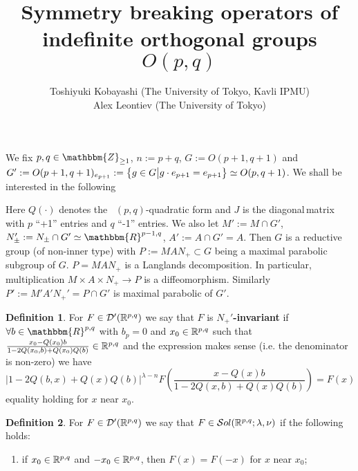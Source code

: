 \documentclass[10pt]{article} %
\newcommand{\assign}{:=}
\newcommand{\sol}{\mathcal{S}ol(\R^{p,q};\lambda,\nu)}
\theoremstyle{definition}
\newtheorem{definition}{Definition}
\newcommand{\tmtextbf}[1]{{\bfseries{#1}}}
\begin{document}
\title{Symmetry breaking operators of indefinite orthogonal groups $O(p,q)$}

  \author{Toshiyuki Kobayashi (The University of Tokyo, Kavli IPMU)\\
  Alex Leontiev (The University of Tokyo)}




  \maketitle

  \begin{versiona}
We fix $p, q \in \mathbbm{Z}_{\geq 1}$, $n \assign p + q$, $G \assign O (p +
1, q + 1)$ and $G' \assign O (p + 1, q + 1)_{e_{p + 1}} \assign \mysetn{g \in
G}{g \cdot e_{p + 1} = e_{p + 1}} \simeq O (p, q + 1)$. We shall be interested
in the following

Here $Q (\cdot)$ denotes the \ $(p, q)$-quadratic form and $J$ is the
diagonal\,matrix with $p$ ``+1'' entries and $q$ ``-1'' entries. We also let
$M' \assign M \cap G'$, $N_{\pm}' \assign N_{\pm} \cap G' \simeq
\mathbbm{R}^{p - 1, q}$, $A' \assign A \cap G' = A$. Then $G$ is a reductive
group (of non-inner type) with $P \assign M A N_+ \subset G$ being a maximal
parabolic subgroup of $G$. $P = M A N_+$ is a Langlands decomposition. In
particular, multiplication $M \times A \times N_+ \rightarrow P$ is a
diffeomorphism. Similarly $P' \assign M' A' N_+' = P \cap G'$ is maximal
parabolic of $G'$.

\begin{definition}
	\label{def1}For $F \in \mathcal{D}' (\mathbb{R}^{p,q})$
  we say that $F$ is
  \tmtextbf{$N_+'$-invariant} if $\forall b \in \mathbbm{R}^{p, q}$
  with $b_p = 0$ and $x_0 \in \mathbb{R}^{p,q}$ such that $\frac{x_0 - Q (x_0) b}{1 - 2 Q
  (x_0, b) + Q (x_0) Q (b)} \in \mathbb{R}^{p,q}$ and the expression makes sense (i.e. the
  denominator is non-zero) we have
  \begin{equation*}
    \label{eq-Nequiv} | 1 - 2 Q (b, x) + Q (x) Q (b) |^{\lambda - n} F \left(
    \frac{x - Q (x) b}{1 - 2 Q (x, b) + Q (x) Q (b)} \right) = F (x)
  \end{equation*}
  equality holding for $x$ near $x_0$.
\end{definition}

\begin{definition}
	\label{def2}For $F \in \mathcal{D}' (\mathbb{R}^{p,q})$
	we say that $F \in \sol$ if the
  following holds:
  \begin{enumerate}
    \item if $x_0 \in \mathbb{R}^{p,q}$ and $- x_0 \in \mathbb{R}^{p,q}$, then $F (x) = F (- x)$ for $x$
    near $x_0$;
    

\end{enumerate}
\end{definition}
\end{versiona}
\end{document}
